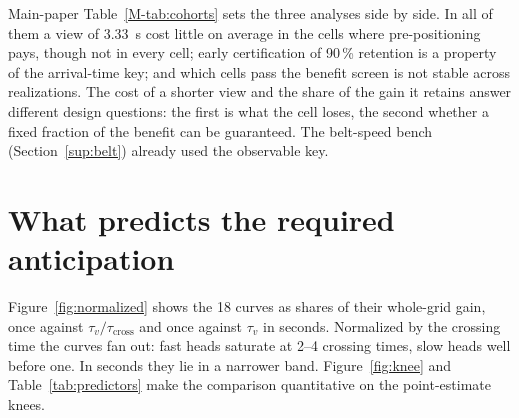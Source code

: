 \documentclass[11pt,a4paper]{article}
\newcommand{\nj}{\textsc{nj}}
\newcommand{\tcross}{\tau_{\mathrm{cross}}}
\newcommand{\tv}{\tau_{v}}
\begin{document}
Main-paper Table~\ref{M-tab:cohorts} sets the three analyses side by side. In all of them a view of
3.33~s cost little on average in the cells where pre-positioning pays, though not in every
cell; early certification of 90\,\% retention is a property of the arrival-time key; and
which cells pass the benefit screen is not stable across realizations. The cost of a
shorter view and the share of the gain it retains answer different design questions: the
first is what the cell loses, the second whether a fixed fraction of the benefit can be
guaranteed. The belt-speed bench (Section~\ref{sup:belt}) already used the observable key.

\begin{table}[t]
\centering\small
\caption{Geometry bench, \nj\ with the observable tie-break, retrospective rerun on the
same 60 realizations (seeds 9000--9059): the 19 cells that pass the benefit criterion under
that key. $G(10\,\mathrm{s})$ and the cost of 3.33~s ($J_{\mathrm{when\_idle}}(3.33\,\mathrm{s})-
J_{\mathrm{when\_idle}}(10\,\mathrm{s})$, positive when the shorter view costs more, with its
individual paired 95\,\% interval; bold when it excludes zero) in s/part; knees as in
Table~\ref{tab:sufficient}, with the 10~s end of the grid among the tested points.}
\label{tab:tiebreak}
\resizebox{\linewidth}{!}{}
\end{table}

\begin{table}[t]
\centering\small
\caption{Geometry bench, \nj\ with the observable tie-break, replication on 60 fresh
realizations (seeds 43700--43759): the 14 cells that pass the benefit criterion. Columns
as in Table~\ref{tab:tiebreak}.}
\label{tab:fresh}
\resizebox{\linewidth}{!}{}
\end{table}


\section{What predicts the required anticipation}\label{sup:predict}
Figure~\ref{fig:normalized} shows the 18 curves as shares of their whole-grid gain, once
against $\tv/\tcross$ and once against $\tv$ in seconds. Normalized by the crossing time
the curves fan out: fast heads saturate at 2--4 crossing times, slow heads well before
one. In seconds they lie in a narrower band. Figure~\ref{fig:knee} and
Table~\ref{tab:predictors} make the comparison quantitative on the point-estimate knees.
\end{document}
